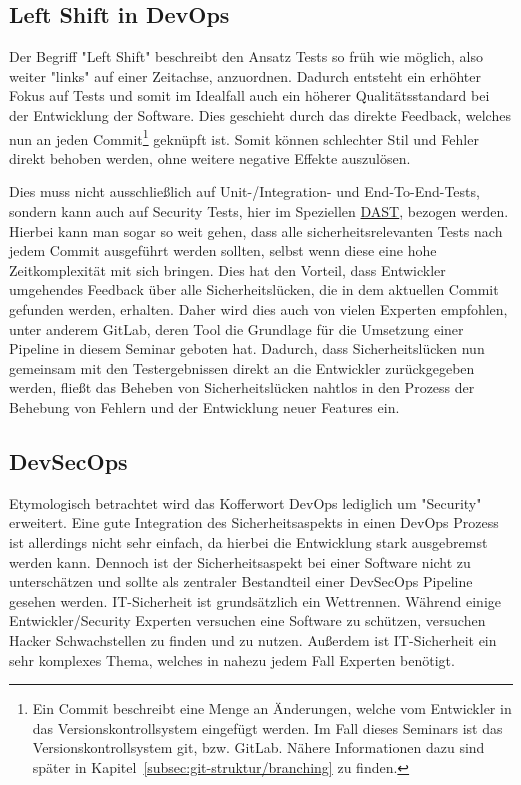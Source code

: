 \subsection{Left Shift in DevOps}

Der Begriff "Left Shift" beschreibt den Ansatz Tests so früh wie möglich, also weiter "links" auf einer Zeitachse, anzuordnen.
Dadurch entsteht ein erhöhter Fokus auf Tests und somit im Idealfall auch ein höherer Qualitätsstandard bei der Entwicklung der Software.\cite{dr.darrellr.schragDevOpsShiftLeft2016}
Dies geschieht durch das direkte Feedback, welches nun an jeden Commit\footnote{Ein Commit beschreibt eine Menge an Änderungen, welche vom Entwickler in das Versionskontrollsystem eingefügt werden.
Im Fall dieses Seminars ist das Versionskontrollsystem git, bzw. GitLab. Nähere Informationen dazu sind später in Kapitel~\ref{subsec:git-struktur/branching} zu finden.} geknüpft ist.
Somit können schlechter Stil und Fehler direkt behoben werden, ohne weitere negative Effekte auszulösen.

Dies muss nicht ausschließlich auf Unit-/Integration- und End-To-End-Tests, sondern kann auch auf Security Tests, hier im Speziellen \hyperref[subsubsec:dast]{DAST}, bezogen werden.
Hierbei kann man sogar so weit gehen, dass alle sicherheitsrelevanten Tests nach jedem Commit ausgeführt werden sollten, selbst wenn diese eine hohe Zeitkomplexität mit sich bringen.
Dies hat den Vorteil, dass Entwickler umgehendes Feedback über alle Sicherheitslücken, die in dem aktuellen Commit gefunden werden, erhalten.
Daher wird dies auch von vielen Experten empfohlen, unter anderem GitLab, deren Tool die Grundlage für die Umsetzung einer Pipeline in diesem Seminar geboten hat.\cite{gitlabSeismicShiftApplication2020}
Dadurch, dass Sicherheitslücken nun gemeinsam mit den Testergebnissen direkt an die Entwickler zurückgegeben werden, fließt das Beheben von Sicherheitslücken nahtlos in den Prozess der Behebung von Fehlern und der Entwicklung neuer Features ein.


\subsection{DevSecOps}

Etymologisch betrachtet wird das Kofferwort DevOps lediglich um "Security" erweitert.
Eine gute Integration des Sicherheitsaspekts in einen DevOps Prozess ist allerdings nicht sehr einfach, da hierbei die Entwicklung stark ausgebremst werden kann.
Dennoch ist der Sicherheitsaspekt bei einer Software nicht zu unterschätzen und sollte als zentraler Bestandteil einer DevSecOps Pipeline gesehen werden.
IT-Sicherheit ist grundsätzlich ein Wettrennen.
Während einige Entwickler/Security Experten versuchen eine Software zu schützen, versuchen Hacker Schwachstellen zu finden und zu nutzen.
Außerdem ist IT-Sicherheit ein sehr komplexes Thema, welches in nahezu jedem Fall Experten benötigt.

